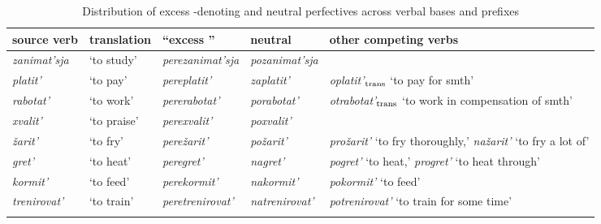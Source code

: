 \begin{sidewaystable}
\caption{Distribution of excess -denoting and neutral perfectives   across verbal bases and prefixes \label{table:competition}}
\begin{tabularx}{\textwidth}{l  l  l  l  Q}
\lsptoprule
source verb& translation & ``excess '' & neutral & other competing verbs\\ \midrule
\textit{zanimat'sja} & `to study' & \textit{perezanimat'sja} & \textit{pozanimat'sja} & \\
\textit{platit'} & `to pay' & \textit{pereplatit'} & \textit{zaplatit'} & \textit{oplatit'$_{\text{\normalfont trans}}$} `to pay for smth'\\
\textit{rabotat'} & `to work' & \textit{pererabotat'} & \textit{porabotat'} & \textit{otrabotat'$_{\text{\normalfont trans}}$} `to work in compensation of smth'\\

\tablevspace
\textit{xvalit'} & `to praise' & \textit{perexvalit'} & \textit{poxvalit'} &\\
\textit{\v{z}arit'} & `to fry' & \textit{pere\v{z}arit'} & \textit{po\v{z}arit'} & \textit{pro\v{z}arit'} `to fry thoroughly,' \textit{na\v{z}arit'} `to fry a lot of'\\ 

\tablevspace
\textit{gret'} & `to heat' & \textit{peregret'} & \textit{nagret'} & \textit{pogret'} `to heat,' \textit{progret'} `to heat through'\\ 
\textit{kormit'} & `to feed' & \textit{perekormit'} & \textit{nakormit'} & \textit{pokormit'} `to feed'\\
\textit{trenirovat'} & `to train' & \textit{peretrenirovat'} & \textit{natrenirovat'} & \textit{potrenirovat'} `to train for some time'\\\lspbottomrule
\end{tabularx}
\end{sidewaystable}

